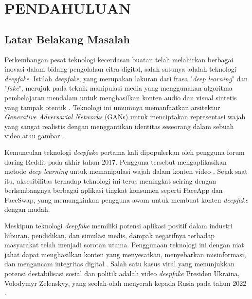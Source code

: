 \chapter{PENDAHULUAN}

\section{Latar Belakang Masalah}

Perkembangan pesat teknologi kecerdasan buatan telah melahirkan berbagai inovasi dalam bidang pengolahan citra digital, salah satunya adalah teknologi \textit{deepfake}. Istilah \textit{deepfake}, yang merupakan lakuran dari frasa "\textit{deep learning}" dan "\textit{fake}", merujuk pada teknik manipulasi media yang menggunakan algoritma pembelajaran mendalam untuk menghasilkan konten audio dan visual sintetis yang tampak otentik \cite{rana2022deepfake}. Teknologi ini umumnya memanfaatkan arsitektur \textit{Generative Adversarial Networks} (GANs) untuk menciptakan representasi wajah yang sangat realistis dengan menggantikan identitas seseorang dalam sebuah video atau gambar \cite{goodfellow2014gan}.

Kemunculan teknologi \textit{deepfake} pertama kali dipopulerkan oleh pengguna forum daring Reddit pada akhir tahun 2017. Pengguna tersebut mengaplikasikan metode \textit{deep learning} untuk memanipulasi wajah dalam konten video \cite{edwards2024}. Sejak saat itu, aksesibilitas terhadap teknologi ini terus meningkat seiring dengan berkembangnya berbagai aplikasi tingkat konsumen seperti FaceApp dan FaceSwap, yang memungkinkan pengguna awam untuk membuat konten \textit{deepfake} dengan mudah.

Meskipun teknologi \textit{deepfake} memiliki potensi aplikasi positif dalam industri hiburan, pendidikan, dan simulasi medis, dampak negatifnya terhadap masyarakat telah menjadi sorotan utama. Penggunaan teknologi ini dengan niat jahat dapat menghasilkan konten yang menyesatkan, menyebarkan misinformasi, dan mengancam integritas digital \cite{dagar2022deepfake}. Salah satu kasus viral yang menunjukkan potensi destabilisasi sosial dan politik adalah video \textit{deepfake} Presiden Ukraina, Volodymyr Zelenskyy, yang seolah-olah menyerah kepada Rusia pada tahun 2022 \cite{tyagi2023analysis}.

